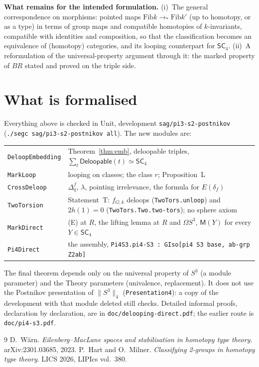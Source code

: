\documentclass[11pt]{amsart}
\theoremstyle{definition}
\theoremstyle{remark}
\newcommand{\Om}{\Omega}
\newcommand{\code}[1]{\texttt{#1}}
\newcommand{\Fib}{\mathrm{Fib}}
\newcommand{\tr}[1]{\|#1\|}
\newcommand{\SCf}{\mathsf{SC}_4}
\begin{document}
\smallskip\noindent\textbf{What remains for the intended formulation.}
(i)~The general correspondence on morphisms: pointed maps $\Fib k\to_*\Fib k'$
(up to homotopy, or as a type) in terms of group maps and compatible
homotopies of $k$-invariants, compatible with identities and composition, so
that the classification becomes an equivalence of (homotopy) categories, and
its looping counterpart for $\SCf$. (ii)~A reformulation of the
universal-property argument through it: the marked property of $BR$ stated
and proved on the triple side.

\section{What is formalised}\label{s:formal}

Everything above is checked in Unit, development \code{sag/pi3-s2-postnikov}
(\code{./segc sag/pi3-s2-postnikov all}). The new modules are:

\smallskip
\noindent
\begin{tabular}{@{}>{\raggedright\arraybackslash}p{}>{\raggedright\arraybackslash}p{}@{}}
\code{DeloopEmbedding} & Theorem~\ref{thm:emb}, deloopable triples, $\sum_t\mathsf{Deloopable}(t)\simeq\SCf$\\
\code{MarkLoop} & looping on classes; the class $r$; Proposition~L\\
\code{CrossDeloop} & $\Delta^f_q$, $\lambda$, pointing irrelevance, the formula for $E(\delta_f)$\\
\code{TwoTorsion} & Statement~T: $f_{G;k}$ deloops (\code{TwoTors.unloop}) and $2h(1)=0$ (\code{TwoTors.Two.two-tors}); no sphere axiom\\
\code{MarkDirect} & (E) at $R$, the lifting lemma at $R$ and $\Om S^3$, $\mathsf M(Y)$ for every $Y\in\SCf$\\
\code{Pi4Direct} & the assembly, \code{Pi4S3.pi4-S3 : GIso[pi4 S3 base, ab-grp Z2ab]}
\end{tabular}

\smallskip\noindent The final theorem depends only on the universal property of
$S^3$ (a module parameter) and the Theory parameters (univalence, replacement).
It does not use the Postnikov presentation of $\tr{S^3}_4$
(\code{Presentation4}): a copy of the development with that module deleted
still checks. Detailed informal proofs, declaration by declaration, are in
\code{doc/delooping-direct.pdf}; the earlier route is \code{doc/pi4-s3.pdf}.

\begin{thebibliography}{9}
 D.~W\"arn. \emph{Eilenberg--MacLane spaces and stabilisation in homotopy
  type theory}. arXiv:2301.03685, 2023.
 P.~Hart and O.~Milner. \emph{Classifying 2-groups in homotopy type
  theory}. LICS 2026, LIPIcs vol.~380.
\end{thebibliography}
\end{document}

